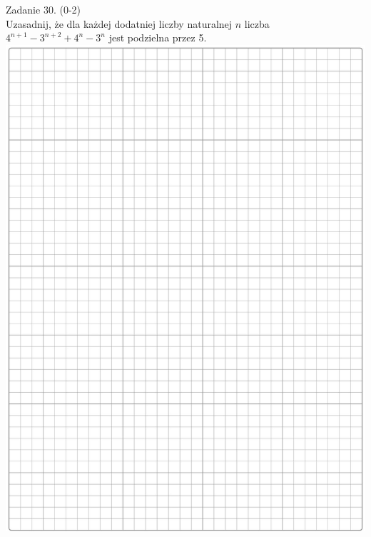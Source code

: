 \documentclass[10pt]{article}
\begin{document}
Zadanie 30. (0-2)\\
Uzasadnij, że dla każdej dodatniej liczby naturalnej \(n\) liczba \(4^{n+1}-3^{n+2}+4^{n}-3^{n}\) jest podzielna przez 5.\\
\includegraphics[max width=\textwidth, center]{2024_11_21_cdea326d19d0c2132b88g-13}
\end{document}
